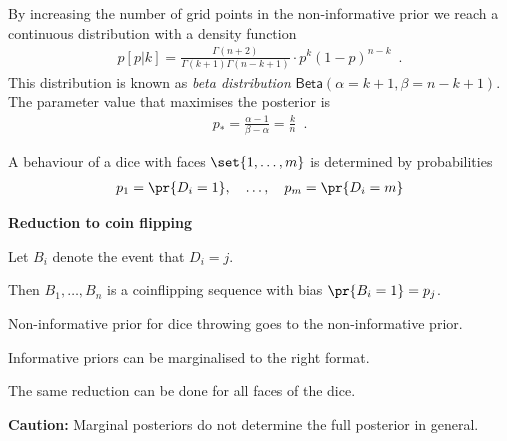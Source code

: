 \documentclass[landscape,footrule]{foils}
\begin{document}

By increasing the number of grid points in the non-informative prior we reach a continuous distribution with a density function
\begin{align*}  
p[p|k] = \frac{\Gamma(n+2)}{\Gamma(k+1)\Gamma(n-k+1)}\cdot p^k(1-p)^{n-k}\enspace.
\end{align*}
This distribution is known as \emph{beta distribution} $\mathsf{Beta}(\alpha=k+1, \beta=n-k+1)$.
The parameter value that maximises the posterior is 
\begin{align*}
p_* =\frac{\alpha-1}{\beta-\alpha}=\frac{k}{n}\enspace.
\end{align*} 


A behaviour of a dice with faces $\set{1,\ldots,m}$ is determined by probabilities 
\begin{align*}
p_1=\pr{D_i=1},\quad\ldots,\quad p_m=\pr{D_i=m}
\end{align*}

\textbf{Reduction to coin flipping} 
\begin{triangles}
\item Let $B_i$ denote the event that $D_i=j$.
\item Then $B_1,\ldots, B_n$ is a coinflipping sequence with bias $\pr{B_i=1}=p_j$.
\item Non-informative prior for dice throwing goes to the non-informative prior.
\item Informative priors can be marginalised to the right format.
\item The same reduction can be done for all faces of the dice.    
\end{triangles} 
\vspace*{1cm}

\textbf{Caution:} Marginal posteriors do not determine the full posterior in general.

\end{document}
